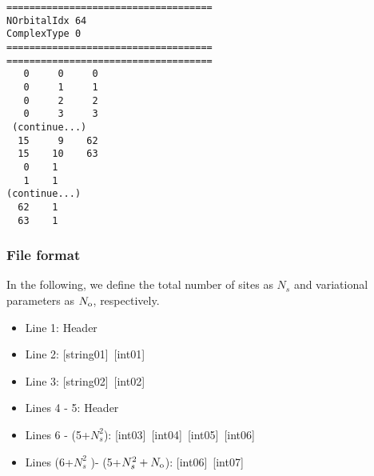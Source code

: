 \begin{minipage}{12.5cm}
\begin{screen}
\begin{verbatim}
====================================
NOrbitalIdx 64   
ComplexType 0
====================================
====================================
   0     0     0 
   0     1     1 
   0     2     2 
   0     3     3 
 (continue...)
  15     9    62 
  15    10    63 
   0    1 
   1    1 
(continue...)
  62    1 
  63    1 
\end{verbatim}
\end{screen}
\end{minipage}

\subsubsection{File format}
In the following, we define the total number of sites as $N_s$ and variational parameters as $N_{\rm o}$, respectively.  

 \begin{itemize}
   \item  Line 1: Header
   \item  Line 2: [string01]~[int01]
   \item  Line 3: [string02]~[int02]
   \item  Lines 4 - 5:  Header
   \item  Lines 6 - (5+$N_s^2$): [int03]~[int04]~[int05]~[int06]
   \item  Lines (6+$N_s^2$ )- (5+$N_s^2+N_{\rm o}$): [int06]~[int07]
  \end{itemize}
